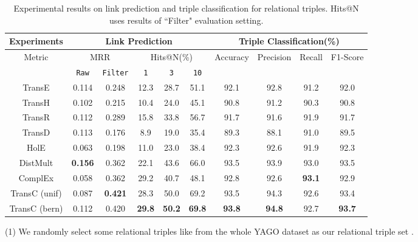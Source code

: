 \documentclass[11pt,a4paper]{article}
\begin{document}
    \begin{table*}[!htb]
      \small
      \centering
      \setlength{\belowcaptionskip}{-1pt}
          \begin{tabular}{c|cc|ccc|cccc}
          \hline
          Experiments & \multicolumn{5}{c|}{Link Prediction} & \multicolumn{4}{c}{Triple Classification(\%)} \\
          \hline
          \multirow{2}{*}{Metric} & \multicolumn{2}{c|}{MRR} & \multicolumn{3}{c|}{Hits@N(\%)} 
          & \multirow{2}{*}{Accuracy} & \multirow{2}{*}{Precision} & \multirow{2}{*}{Recall} & \multirow{2}{*}{F1-Score} \\
          & \texttt{Raw} & \texttt{Filter} & \texttt{1} & \texttt{3} & \texttt{10} &  &  &  &   \\
          \hline
          TransE  & 0.114  & 0.248  & 12.3   & 28.7  & 51.1 & 92.1  & 92.8  & 91.2   & 92.0 \\
          TransH   & 0.102  & 0.215   & 10.4   & 24.0  & 45.1 & 90.8  & 91.2   & 90.3   & 90.8  \\
          TransR   & 0.112  & 0.289   & 15.8   & 33.8 & 56.7 & 91.7  & 91.6   & 91.9   & 91.7  \\
          TransD   & 0.113  & 0.176   & 8.9   & 19.0 & 35.4 & 89.3  & 88.1   & 91.0   & 89.5  \\
          HolE & 0.063  & 0.198   & 11.0   & 23.0 & 38.4 & 92.3  & 92.6   & 91.9   & 92.3  \\
          DistMult & \textbf{0.156}  & 0.362   & 22.1   & 43.6 & 66.0 & 93.5  & 93.9   & 93.0   & 93.5  \\
          ComplEx & 0.058  & 0.362   & 29.2   & 40.7 & 48.1 & 92.8  & 92.6   & \textbf{93.1}   & 92.9  \\
          \hline
          TransC (unif)  & 0.087  & \textbf{0.421}   & 28.3   & 50.0 & 69.2 & 93.5  & 94.3   & 92.6   & 93.4  \\
          TransC (bern)  & 0.112  & 0.420   & \textbf{29.8}   & \textbf{50.2} &  \textbf{69.8} & \textbf{93.8}  & \textbf{94.8}   & 92.7   & \textbf{93.7}   \\
          \hline
          \end{tabular}
          \caption{\label{table2}Experimental results on link prediction and triple classification for relational triples. 
      Hits@N uses results of ``Filter" evaluation setting.}
      \end{table*}
  
  (1) We randomly select some relational triples like  from the whole YAGO dataset as our relational triple set .
  
\end{document}
